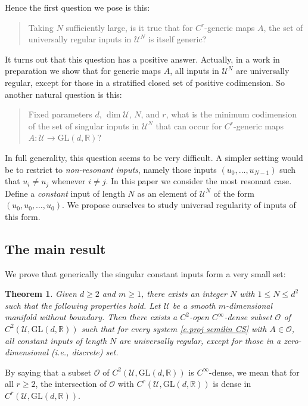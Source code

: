 \documentclass[10pt, a4paper]{amsart}
\theoremstyle{plain}
\newtheorem{thm}[lemma]{Theorem}
\theoremstyle{definition}
\theoremstyle{remark}
\theoremstyle{note}
\numberwithin{equation}{section}
\begin{document}
Hence the first question we pose is this: 
\begin{quote}
Taking $N$ sufficiently large, is it true that for $C^r$-generic maps $A$, the set of universally regular inputs in ${\mathcal{U}}^N$ is itself generic?
\end{quote}
It turns out that this question has a positive answer.
Actually, in a work in preparation we show that for generic maps $A$, 
all inputs in ${\mathcal{U}}^N$ are universally regular, except for those in 
a stratified closed set of positive codimension.
So another natural question is this:
\begin{quote}
Fixed parameters $d$, $\dim {\mathcal{U}}$, $N$, and $r$,
what is the minimum codimension of the set of singular inputs in ${\mathcal{U}}^N$
that can occur for $C^r$-generic maps $A \colon {\mathcal{U}} \to {\mathrm{GL}}(d,{\mathbb{R}})$?
\end{quote}
In full generality, this question seems to be very difficult.
A simpler setting would be to restrict to \emph{non-resonant inputs}, 
namely those inputs $(u_0,\dots,u_{N-1})$ such that $u_i \neq u_j$ whenever $i \neq j$.  
In this paper we consider the most resonant case.
Define a \emph{constant} input of length $N$ 
as an element of ${\mathcal{U}}^N$ of the form $(u_0, u_0, \dots, u_0)$.
We propose ourselves to study universal regularity of inputs of this form.

\subsection{The main result}\label{ss.main_statements}

We prove that generically the singular constant inputs form a very small set:
 
\begin{thm}\label{t.main}
Given $d\ge 2$ and $m \ge 1$, there exists an integer $N$ with $1 \le N \le d^2$ 
such that the following properties hold.
Let ${\mathcal{U}}$ be a smooth $m$-dimensional manifold without boundary.
Then there exists a $C^2$-open $C^\infty$-dense subset ${\mathcal{O}}$ of $C^2({\mathcal{U}}, {\mathrm{GL}}(d,{\mathbb{R}}))$ 
such that for every system \eqref{e.proj semilin CS} with $A \in {\mathcal{O}}$,
all constant inputs of length $N$ are universally regular, except for 
those in a zero-dimensional (i.e., discrete) set.
\end{thm}

By saying that a subset ${\mathcal{O}}$ of $C^2({\mathcal{U}}, {\mathrm{GL}}(d,{\mathbb{R}}))$ is  $C^\infty$-dense, 
we mean that for all $r \ge 2$, the intersection of ${\mathcal{O}}$ with $C^r({\mathcal{U}}, {\mathrm{GL}}(d,{\mathbb{R}}))$ 
is dense in $C^r({\mathcal{U}}, {\mathrm{GL}}(d,{\mathbb{R}}))$.
\end{document}
